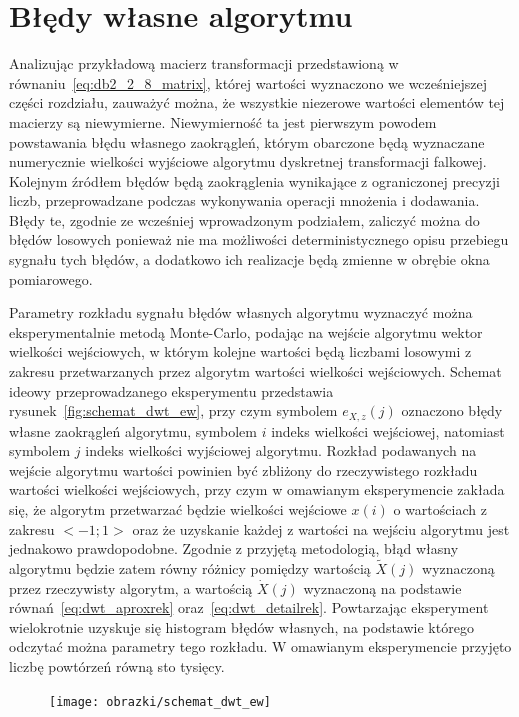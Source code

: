 \section{Błędy własne algorytmu}

Analizując przykładową macierz transformacji przedstawioną w równaniu~\eqref{eq:db2_2_8_matrix}, której wartości wyznaczono we wcześniejszej części rozdziału, zauważyć można, że wszystkie niezerowe wartości elementów tej macierzy są niewymierne. Niewymierność ta jest pierwszym powodem powstawania błędu własnego zaokrągleń, którym obarczone będą wyznaczane numerycznie wielkości wyjściowe algorytmu dyskretnej transformacji falkowej. Kolejnym źródłem błędów będą zaokrąglenia wynikające z ograniczonej precyzji liczb, przeprowadzane podczas wykonywania operacji mnożenia i dodawania. Błędy te, zgodnie ze wcześniej wprowadzonym podziałem, zaliczyć można do błędów losowych ponieważ nie ma możliwości deterministycznego opisu przebiegu sygnału tych błędów, a dodatkowo ich realizacje będą zmienne w obrębie okna pomiarowego.

Parametry rozkładu sygnału błędów własnych algorytmu wyznaczyć można eksperymentalnie metodą Monte-Carlo, podając na wejście algorytmu wektor wielkości wejściowych, w którym kolejne wartości będą liczbami losowymi z zakresu przetwarzanych przez algorytm wartości wielkości wejściowych. Schemat ideowy przeprowadzanego eksperymentu przedstawia rysunek~\ref{fig:schemat_dwt_ew}, przy czym symbolem $e_{X,z}(j)$ oznaczono błędy własne zaokrągleń algorytmu, symbolem $i$ indeks wielkości wejściowej, natomiast symbolem $j$ indeks wielkości wyjściowej algorytmu. Rozkład podawanych na wejście algorytmu wartości powinien być zbliżony do rzeczywistego rozkładu wartości wielkości wejściowych, przy czym w omawianym eksperymencie zakłada się, że algorytm przetwarzać będzie wielkości wejściowe $x(i)$ o wartościach z zakresu $<-1;1>$ oraz że uzyskanie każdej z wartości na wejściu algorytmu jest jednakowo prawdopodobne. Zgodnie z przyjętą metodologią, błąd własny algorytmu będzie zatem równy różnicy pomiędzy wartością $\tilde{X}(j)$ wyznaczoną przez rzeczywisty algorytm, a wartością $\dot{X}(j)$ wyznaczoną na podstawie równań~\eqref{eq:dwt_aproxrek} oraz~\eqref{eq:dwt_detailrek}. Powtarzając eksperyment wielokrotnie uzyskuje się histogram błędów własnych, na podstawie którego odczytać można parametry tego rozkładu. W omawianym eksperymencie przyjęto liczbę powtórzeń równą sto tysięcy.

\begin{figure}[htb!]
\begin{center}
\texttt{[image: obrazki/schemat\_dwt\_ew]}
\end{center}
\end{figure}

